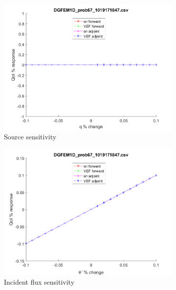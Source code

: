 \documentclass{article}
\begin{document}
\begin{figure}[H]
\label{Case67Sens}
\centering
\begin{subfigure}{.5\textwidth}
  \centering
  \includegraphics[width=.98\linewidth]{IanProposal/figures2/67qSens.png}
  \caption{Source sensitivity}
  \label{fig:sfig1}
\end{subfigure}%
\begin{subfigure}{.5\textwidth}
  \centering
  \includegraphics[width=.98\linewidth]{IanProposal/figures2/67incSens.png}
  \caption{Incident flux sensitivity}
  \label{fig:sfig4}
\end{subfigure}%
\\
\begin{subfigure}{.5\textwidth}
  \centering

\end{subfigure}
\end{figure}
\end{document}
